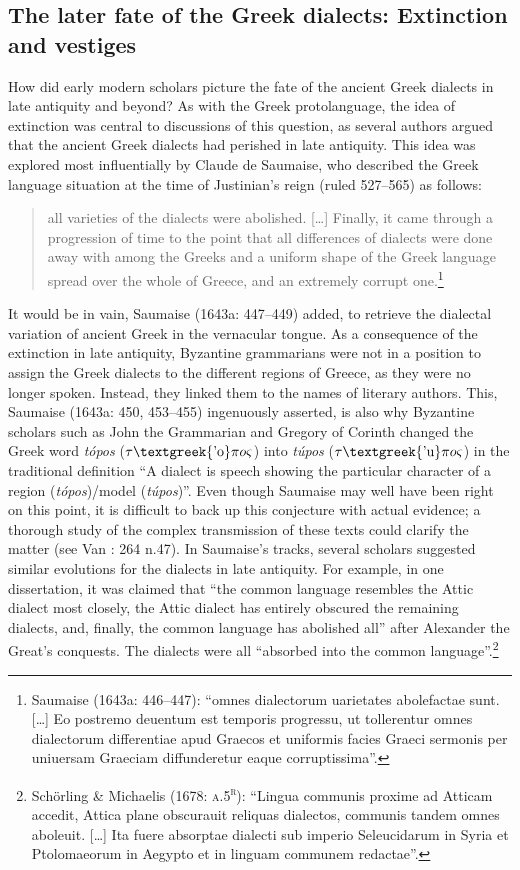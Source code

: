 \subsection{The later fate of the Greek dialects: Extinction and vestiges}
\hypertarget{Toc19704839}{}
How did early modern scholars picture the fate of the ancient Greek dialects in late antiquity and beyond? As with the Greek protolanguage, the idea of extinction was central to discussions of this question, as several authors argued that the ancient Greek dialects had perished in late antiquity. This idea was explored most influentially by Claude de Saumaise, who described the Greek language situation at the time of Justinian’s reign (ruled 527–565) as follows:

\begin{quote}
all varieties of the dialects were abolished. […] Finally, it came through a progression of time to the point that all differences of dialects were done away with among the Greeks and a uniform shape of the Greek language spread over the whole of Greece, and an extremely corrupt one.\footnote{Saumaise (1643a: 446–447): “omnes dialectorum uarietates abolefactae sunt. […] Eo postremo deuentum est temporis progressu, ut tollerentur omnes dialectorum differentiae apud Graecos et uniformis facies Graeci sermonis per uniuersam Graeciam diffunderetur eaque corruptissima”.}
\end{quote}

It would be in vain, Saumaise (1643a: 447–449) added, to retrieve the dialectal variation of ancient Greek in the vernacular tongue. As a consequence of the extinction in late antiquity, Byzantine grammarians were not in a position to assign the Greek dialects to the different regions of Greece, as they were no longer spoken. Instead, they linked them to the names of literary authors. This, Saumaise (1643a: 450, 453–455) ingenuously asserted, is also why Byzantine scholars such as John the Grammarian and Gregory of Corinth changed the Greek word \textit{tópos} ($\tau \text{\textgreek{'o}}\pi o\varsigma $) into \textit{túpos} ($\tau \text{\textgreek{'u}}\pi o\varsigma $) in the traditional definition “A dialect is speech showing the particular character of a region (\textit{tópos})/model (\textit{túpos})”. Even though Saumaise may well have been right on this point, it is difficult to back up this conjecture with actual evidence; a thorough study of the complex transmission of these texts could clarify the matter (see Van \citealt{Rooy2016d}: 264 n.47). In Saumaise’s tracks, several scholars suggested similar evolutions for the dialects in late antiquity. For example, in one dissertation, it was claimed that “the common language resembles the Attic dialect most closely, the Attic dialect has entirely obscured the remaining dialects, and, finally, the common language has abolished all” after Alexander the Great’s conquests. The dialects were all “absorbed into the common language”.\footnote{Schörling \& Michaelis (1678: \textsc{a.5}\textsc{\textsuperscript{r}}): “Lingua communis proxime ad Atticam accedit, Attica plane obscurauit reliquas dialectos, communis tandem omnes aboleuit. […] Ita fuere absorptae dialecti sub imperio Seleucidarum in Syria et Ptolomaeorum in Aegypto et in linguam communem redactae”.}

